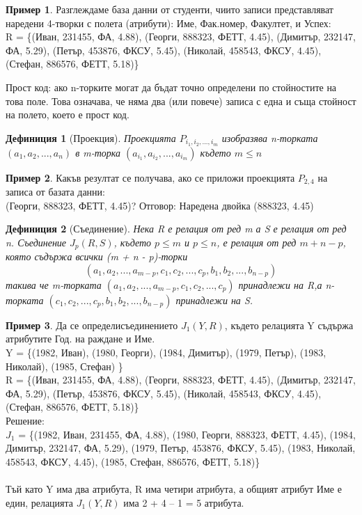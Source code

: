 \documentclass[fleqn, 12pt]{article}
\newtheorem{definition}{Дефиниция}[subsection]
\theoremstyle{definition}
\newtheorem{example}{Пример}[subsection]
\begin{document}
\begin{example}
Разглеждаме база данни от студенти, чиито записи представляват наредени 4-творки с полета (атрибути): Име, Фак.номер, Факултет, и Успех: \\
R = \{(Иван, 231455, ФА, 4.88),\;
(Георги, 888323, ФЕТТ, 4.45),\; 
(Димитър, 232147, ФА, 5.29),\;
(Петър, 453876, ФКСУ, 5.45),\;
(Николай, 458543, ФКСУ, 4.45),\;
(Стефан, 886576, ФЕТТ, 5.18)\}
\end{example}
Прост код: ако n-торките  могат да бъдат точно определени по стойностите на това поле. Това означава, че няма два (или повече) записа  с една и съща стойност на полето, което е прост код.\\

\begin{definition}[Проекция]
Проекцията $P_{i_1, i_2, ..., i_m}$ изобразява n-торката $(a_1, a_2 , ..., a_n)$ в m-торка $(a_{i_1}, a_{i_2}, ..., a_{i_m})$ където $m \leq n $
\end{definition}

\begin{example}
Какъв резултат се получава, ако се приложи проекцията $P_{2,4}$ на записа от базата данни:\\
(Георги, 888323, ФЕТТ, 4.45)?
Отговор: Наредена двойка (888323, 4.45)
\end{example}

\begin{definition}[Съединение]
Нека R е релация от ред m а S е релация от ред n. Съединение $J_p(R, S)$, където $p \leq m$ и $p \leq n$, е релация от ред $m + n - p$, която съдържа всички (m + n - p)-торки $$(a_1, a_2, ..., a_{m-p}, c_1, c_2, ..., c_p, b_1, b_2, ..., b_{n-p})$$ такива че m-торката $(a_1, a_2, ..., a_{m-p}, c_1, c_2, ..., c_p)$ принадлежи на R,а n-торката $(c_1, c_2, ..., c_p, b_1, b_2, ..., b_{n-p})$ принадлежи на S.
\end{definition}

\begin{example}
Да се определисъединението $J_1(Y, R)$, където релацията Y съдържа атрибутите Год. на раждане и Име. \\
Y = \{(1982, Иван),\;
(1980, Георги), \;
(1984, Димитър),\;
(1979, Петър),\; 
(1983, Николай),\;
(1985, Стефан) \}
\\
R = \{(Иван, 231455, ФА, 4.88),\;
(Георги, 888323, ФЕТТ, 4.45),\; 
(Димитър, 232147, ФА, 5.29),\;
(Петър, 453876, ФКСУ, 5.45),\;
(Николай, 458543, ФКСУ, 4.45),\;
(Стефан, 886576, ФЕТТ, 5.18)\} 
\\
Решение: \\
$J_1$ = \{(1982, Иван, 231455, ФА, 4.88),\;
(1980, Георги, 888323, ФЕТТ, 4.45),\;
(1984, Димитър, 232147, ФА, 5.29),\;
(1979, Петър, 453876, ФКСУ, 5.45),\;
(1983, Николай, 458543, ФКСУ, 4.45),\;
(1985, Стефан, 886576, ФЕТТ, 5.18)\} \\
\\
Тъй като Y има два атрибута, R има четири атрибута, а общият атрибут Име е един, релацията $J_1(Y, R)$ има 2 + 4 – 1 = 5 атрибута.
\end{example}
\end{document}
